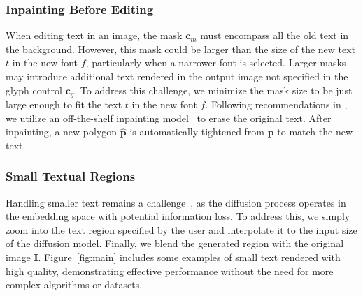 \subsubsection{Inpainting Before Editing}
When editing text in an image, the mask $\boldsymbol{c}_m$ must encompass all the old text in the background. However, this mask could be larger than the size of the new text $t$ in the new font $f$, particularly when a narrower font is selected. Larger masks may introduce additional text rendered in the output image not specified in the glyph control $\boldsymbol{c}_g$.
To address this challenge, we minimize the mask size to be just large enough to fit the text $t$ in the new font $f$. Following recommendations in \cite{li2024first}, we utilize an off-the-shelf inpainting model~\cite{razzhigaev2023kandinsky} to erase the original text. After inpainting, a new polygon $\hat{\boldsymbol{p}}$ is automatically tightened
from $\boldsymbol{p}$ to match the new text.


\subsubsection{Small Textual Regions}
Handling smaller text remains a challenge~\cite{liu2024glyph, paliwal2024customtext}, as the diffusion process operates in the embedding space with potential information loss. To address this, we simply zoom into the text region specified by the user and interpolate it to the input size of the diffusion model. Finally, we blend the generated region with the original image $\boldsymbol{I}$. Figure~\ref{fig:main} includes some examples of small text rendered with high quality, demonstrating effective performance without the need for more complex algorithms or datasets.


